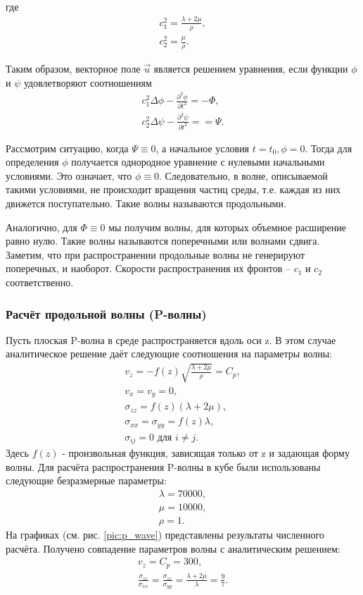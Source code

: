 где 
\begin{eqnarray}
c_1^2 = \frac{\lambda+2\mu}{\rho}, \\
c_2^2 = \frac{\mu}{\rho}.
\end{eqnarray}

Таким образом, векторное поле $\vec{u}$ является решением уравнения, если функции $\phi$ и $\psi$ удовлетворяют соотношениям
\begin{eqnarray}
c_1^2\Delta\phi - \frac{\partial^2 \phi}{\partial t^2} = -\Phi, \\
c_2^2\Delta\psi - \frac{\partial^2 \psi}{\partial t^2} = =\Psi.
\end{eqnarray}

Рассмотрим ситуацию, когда $\Psi \equiv 0$, а начальное условия $t = t_0, \phi = 0$. Тогда для определения $\phi$ получается однородное уравнение с нулевыми начальными условиями. Это означает, что $\phi \equiv 0$. Следовательно, в волне, описываемой такими условиями, не происходит вращения частиц среды, т.е. каждая из них движется поступательно. Такие волны называются продольными.

Аналогично, для $\Phi \equiv 0$ мы получим волны, для которых объемное расширение равно нулю. Такие волны называются поперечными или волнами сдвига. Заметим, что при распространении продольные волны не генерируют поперечных, и наоборот. Скорости распространения их фронтов -- $c_1$ и $c_2$ соответственно.


\subsubsection{Расчёт продольной волны (P-волны)}
Пусть плоская P-волна в среде распространяется вдоль оси z. В этом случае аналитическое решение даёт следующие соотношения на параметры волны:
\begin{eqnarray}
v_z=-f(z)\sqrt{\frac{\lambda+2\mu}{\rho}}=C_p, \\
v_x=v_y=0, \\
\sigma_{zz}=f(z)(\lambda+2\mu), \\
\sigma_{xx}=\sigma_{yy}=f(z)\lambda, \\
\sigma_{ij}=0 \textrm{ для } i \neq j.
\end{eqnarray}
Здесь $f(z)$ - произвольная функция, зависящая только от z и задающая форму волны.
Для расчёта распространения P-волны в кубе были использованы следующие безразмерные параметры: 
\begin{eqnarray}
\lambda=70000, \\
\mu=10000, \\
\rho=1.
\end{eqnarray}
На графиках (см. рис. \ref{pic:p_wave}) представлены результаты численного расчёта. Получено совпадение параметров волны с аналитическим решением:
\begin{eqnarray}
v_z=C_p=300, \\
\frac{\sigma_{zz}}{\sigma_{xx}}=\frac{\sigma_{zz}}{\sigma_{yy}}=\frac{\lambda+2\mu}{\lambda}=\frac{9}{7}.
\end{eqnarray}

